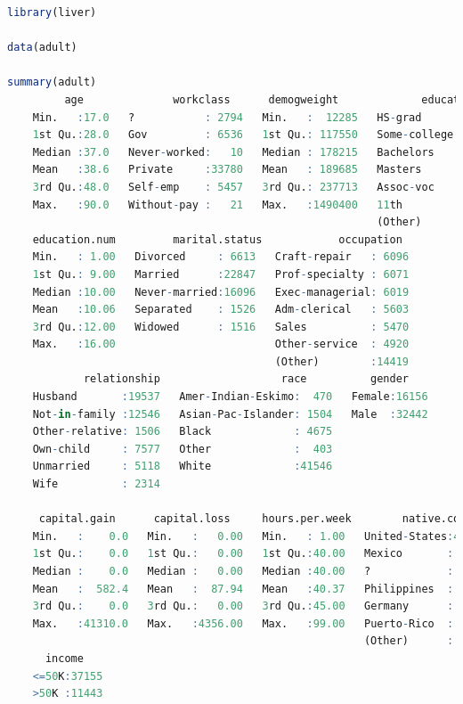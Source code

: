 \documentclass[
  11pt,
]{book}
\theoremstyle{definition}
\theoremstyle{definition}
\theoremstyle{definition}
\theoremstyle{definition}
\theoremstyle{remark}
\begin{document}
\begin{lstlisting}[language=R]
library(liver)

data(adult)

summary(adult)
         age              workclass      demogweight             education    
    Min.   :17.0   ?           : 2794   Min.   :  12285   HS-grad     :15750  
    1st Qu.:28.0   Gov         : 6536   1st Qu.: 117550   Some-college:10860  
    Median :37.0   Never-worked:   10   Median : 178215   Bachelors   : 7962  
    Mean   :38.6   Private     :33780   Mean   : 189685   Masters     : 2627  
    3rd Qu.:48.0   Self-emp    : 5457   3rd Qu.: 237713   Assoc-voc   : 2058  
    Max.   :90.0   Without-pay :   21   Max.   :1490400   11th        : 1812  
                                                          (Other)     : 7529  
    education.num         marital.status            occupation   
    Min.   : 1.00   Divorced     : 6613   Craft-repair   : 6096  
    1st Qu.: 9.00   Married      :22847   Prof-specialty : 6071  
    Median :10.00   Never-married:16096   Exec-managerial: 6019  
    Mean   :10.06   Separated    : 1526   Adm-clerical   : 5603  
    3rd Qu.:12.00   Widowed      : 1516   Sales          : 5470  
    Max.   :16.00                         Other-service  : 4920  
                                          (Other)        :14419  
            relationship                   race          gender     
    Husband       :19537   Amer-Indian-Eskimo:  470   Female:16156  
    Not-in-family :12546   Asian-Pac-Islander: 1504   Male  :32442  
    Other-relative: 1506   Black             : 4675                 
    Own-child     : 7577   Other             :  403                 
    Unmarried     : 5118   White             :41546                 
    Wife          : 2314                                            
                                                                    
     capital.gain      capital.loss     hours.per.week        native.country 
    Min.   :    0.0   Min.   :   0.00   Min.   : 1.00   United-States:43613  
    1st Qu.:    0.0   1st Qu.:   0.00   1st Qu.:40.00   Mexico       :  949  
    Median :    0.0   Median :   0.00   Median :40.00   ?            :  847  
    Mean   :  582.4   Mean   :  87.94   Mean   :40.37   Philippines  :  292  
    3rd Qu.:    0.0   3rd Qu.:   0.00   3rd Qu.:45.00   Germany      :  206  
    Max.   :41310.0   Max.   :4356.00   Max.   :99.00   Puerto-Rico  :  184  
                                                        (Other)      : 2507  
      income     
    <=50K:37155  
    >50K :11443  
                 
                 
                 
                 
   
\end{lstlisting}
\end{document}
